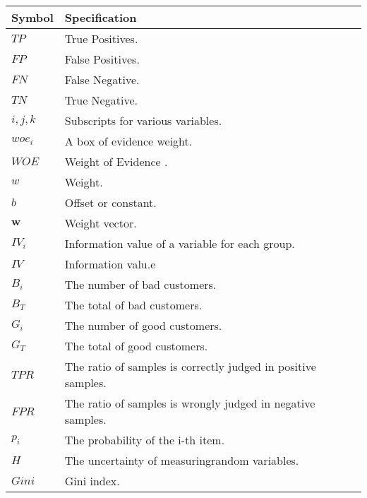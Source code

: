 \documentclass{mcmthesis}
\begin{document}
\begin{table}[htb]
\centering

\begin{tabular}{ll} 
\toprule

Symbol & Specification \\
\toprule
$TP$ & True Positives. \\

$FP$ & False Positives.\\

$FN$ & False Negative. \\

$TN$ & True Negative. \\

$i,j,k$ & Subscripts for various variables. \\

$woe_i$ & A box of evidence weight. \\

$WOE$ & Weight of Evidence .\\

$w$ & Weight. \\

$b$ & Offset or constant. \\

$\mathbf{w}$ & Weight vector. \\

$IV_i$ & Information value of a variable for each group.  \\

$IV$ & Information valu.e \\

$B_i$ & The number of bad customers. \\

$B_T$ & The total of bad customers. \\

$G_i$ & The number of good customers. \\

$G_T$ & The total  of good customers. \\

$TPR$ & The ratio of samples is correctly judged in positive samples.\\

$FPR$ & The ratio of samples is wrongly judged in negative samples.\\

$p_i$ & The probability of the i-th item.\\

$H$ & The uncertainty of measuringrandom variables.\\

$Gini$ & Gini index. \\
\bottomrule
\end{tabular}
\end{table}
\end{document}
